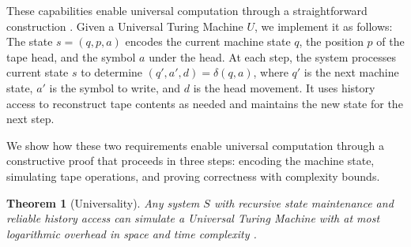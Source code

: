 \documentclass[12pt]{article}
\newtheorem{theorem}{Theorem}
\begin{document}
These capabilities enable universal computation through a straightforward construction \cite{deutsch1995universality,bennett1989time}.
Given a Universal Turing Machine $U$, we implement it as follows: The state $s = (q, p, a)$ encodes the current machine state $q$, the position $p$ of the tape head, and the symbol $a$ under the head.
At each step, the system processes current state $s$ to determine $(q', a', d) = \delta(q, a)$, where $q'$ is the next machine state, $a'$ is the symbol to write, and $d$ is the head movement.
It uses history access to reconstruct tape contents as needed and maintains the new state for the next step.

We show how these two requirements enable universal computation through a constructive proof that proceeds in three steps: encoding the machine state, simulating tape operations, and proving correctness with complexity bounds.

\vspace{1em}

\begin{theorem}[Universality]
Any system $S$ with recursive state maintenance and reliable history access can simulate a Universal Turing Machine with at most logarithmic overhead in space and time complexity \cite{boyle2024memory,liskiewicz1994complexity}.
\end{theorem}
\end{document}
